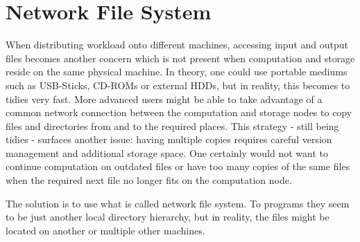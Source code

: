\section{Network File System}

When distributing workload onto different machines, accessing input and output files becomes another concern which is not present when computation and storage reside on the same physical machine.
In theory, one could use portable mediums such as USB-Sticks, CD-ROMs or external HDDs, but in reality, this becomes to tidies very fast.
More advanced users might be able to take advantage of a common network connection between the computation and storage nodes to copy files and directories from and to the required places.
This strategy - still being tidies - surfaces another issue: having multiple copies requires careful version management and additional storage space.
One certainly would not want to continue computation on outdated files or have too many copies of the same files when the required next file no longer fits on the computation node.

The solution is to use what is called network file system.
To programs they seem to be just another local directory hierarchy, but in reality, the files might be located on another or multiple other machines.

